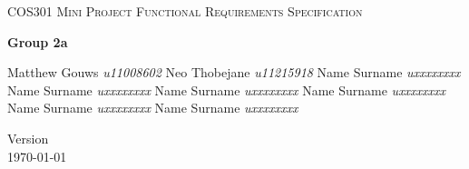 \begin{titlepage}
\begin{center}

\textsc{\LARGE COS301 Mini Project Functional Requirements Specification}

\textbf{Group 2a} \\
\begin{flushright} \large
Matthew Gouws \emph{u11008602} \newline
Neo Thobejane \emph{u11215918} \newline
Name Surname \emph{uxxxxxxxx} \newline
Name Surname \emph{uxxxxxxxx} \newline
Name Surname \emph{uxxxxxxxx} \newline
Name Surname \emph{uxxxxxxxx} \newline
Name Surname \emph{uxxxxxxxx} \newline
Name Surname \emph{uxxxxxxxx} \newline
\end{flushright}

\vfill

{\large Version }
\\
{\large \today}

\end{center}
\end{titlepage}
